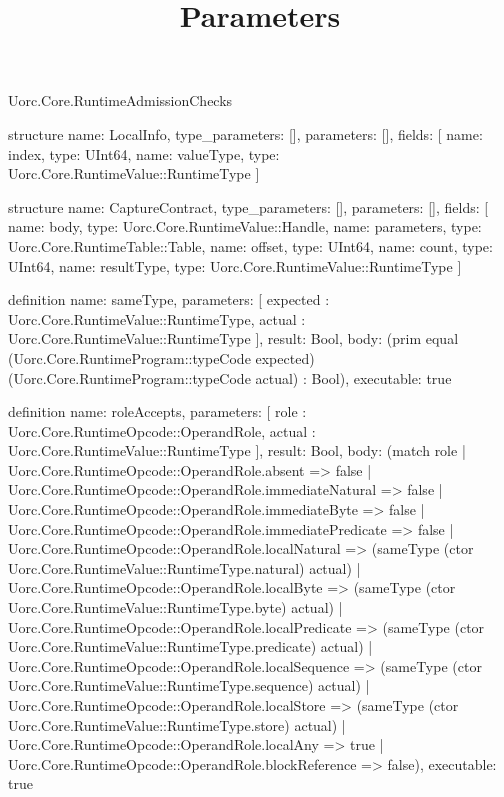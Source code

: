 \begin{lexlean}{Uorc.Core.RuntimeAdmissionChecks}
\title{Parameters}
\begin{semanticmodule}
structure{
  name: LocalInfo,
  type_parameters: [],
  parameters: [],
  fields: [
    {name: index, type: UInt64},
    {name: valueType, type: Uorc.Core.RuntimeValue::RuntimeType}
  ]
}

structure{
  name: CaptureContract,
  type_parameters: [],
  parameters: [],
  fields: [
    {name: body, type: Uorc.Core.RuntimeValue::Handle},
    {name: parameters, type: Uorc.Core.RuntimeTable::Table},
    {name: offset, type: UInt64},
    {name: count, type: UInt64},
    {name: resultType, type: Uorc.Core.RuntimeValue::RuntimeType}
  ]
}

definition{
  name: sameType,
  parameters: [
    expected : Uorc.Core.RuntimeValue::RuntimeType,
    actual : Uorc.Core.RuntimeValue::RuntimeType
  ],
  result: Bool,
  body: (prim equal (Uorc.Core.RuntimeProgram::typeCode expected) (Uorc.Core.RuntimeProgram::typeCode actual) : Bool),
  executable: true
}

definition{
  name: roleAccepts,
  parameters: [
    role : Uorc.Core.RuntimeOpcode::OperandRole,
    actual : Uorc.Core.RuntimeValue::RuntimeType
  ],
  result: Bool,
  body: (match role
    | Uorc.Core.RuntimeOpcode::OperandRole.absent => false
    | Uorc.Core.RuntimeOpcode::OperandRole.immediateNatural => false
    | Uorc.Core.RuntimeOpcode::OperandRole.immediateByte => false
    | Uorc.Core.RuntimeOpcode::OperandRole.immediatePredicate => false
    | Uorc.Core.RuntimeOpcode::OperandRole.localNatural => (sameType (ctor Uorc.Core.RuntimeValue::RuntimeType.natural) actual)
    | Uorc.Core.RuntimeOpcode::OperandRole.localByte => (sameType (ctor Uorc.Core.RuntimeValue::RuntimeType.byte) actual)
    | Uorc.Core.RuntimeOpcode::OperandRole.localPredicate => (sameType (ctor Uorc.Core.RuntimeValue::RuntimeType.predicate) actual)
    | Uorc.Core.RuntimeOpcode::OperandRole.localSequence => (sameType (ctor Uorc.Core.RuntimeValue::RuntimeType.sequence) actual)
    | Uorc.Core.RuntimeOpcode::OperandRole.localStore => (sameType (ctor Uorc.Core.RuntimeValue::RuntimeType.store) actual)
    | Uorc.Core.RuntimeOpcode::OperandRole.localAny => true
    | Uorc.Core.RuntimeOpcode::OperandRole.blockReference => false),
  executable: true
}


\end{semanticmodule}
\end{lexlean}
